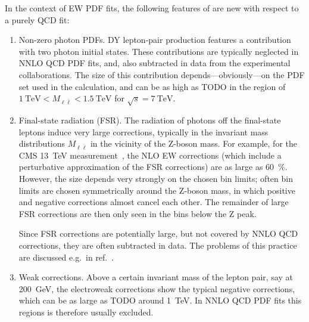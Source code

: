 In the context of EW PDF fits, the following features of are new with respect to a purely QCD fit:
\begin{enumerate}
\item Non-zero photon PDFs.
DY lepton-pair production features a contribution with two photon initial states.
These contributions are typically neglected in NNLO QCD PDF fits, and, also subtracted in data from the experimental collaborations.
The size of this contribution depends---obviously---on the PDF set used in the calculation, and can be as high as TODO in the region of $\SI{1}{\tera\electronvolt} < M_{\ell\bar{\ell}} < \SI{1.5}{\tera\electronvolt}$ for $\sqrt{s} = \SI{7}{\tera\electronvolt}$.
\item Final-state radiation (FSR).
The radiation of photons off the final-state leptons induce very large corrections, typically in the invariant mass distributions $M_{\ell\bar{\ell}}$ in the vicinity of the Z-boson mass.
For example, for the CMS \SI{13}{\tera\electronvolt} measurement~\cite{Sirunyan:2018owv}, the NLO EW corrections (which include a perturbative approximation of the FSR corrections) are as large as \SI{60}{\percent}.
However, the size depends very strongly on the chosen bin limits; often bin limits are chosen symmetrically around the Z-boson mass, in which positive and negative corrections almost cancel each other.
The remainder of large FSR corrections are then only seen in the bins below the Z peak.

Since FSR corrections are potentially large, but not covered by NNLO QCD corrections, they are often subtracted in data.
The problems of this practice are discussed e.g.\ in ref.~\cite{Carrazza:2020gss}.
\item Weak corrections.
Above a certain invariant mass of the lepton pair, say at \SI{200}{\giga\electronvolt}, the electroweak corrections show the typical negative corrections, which can be as large as TODO around \SI{1}{\tera\electronvolt}.
In NNLO QCD PDF fits this regions is therefore usually excluded.
\end{enumerate}


